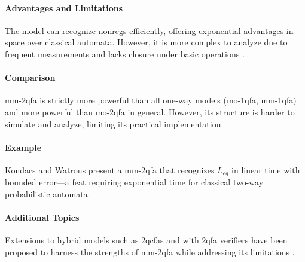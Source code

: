 \paragraph{Advantages and Limitations} The model can recognize non\glspl{reg} efficiently, offering exponential advantages in space over classical automata. However, it is more complex to analyze due to frequent measurements and lacks closure under basic operations \cite{kondacs1997power, qiu2008state}.

\paragraph{Comparison} \gls{mm-2qfa} is strictly more powerful than all one-way models (\gls{mo-1qfa}, \gls{mm-1qfa}) and more powerful than \gls{mo-2qfa} in general. However, its structure is harder to simulate and analyze, limiting its practical implementation.

\paragraph{Example} Kondacs and Watrous \cite{kondacs1997power} present a \gls{mm-2qfa} that recognizes $L_{eq}$ in linear time with bounded error—a feat requiring exponential time for classical two-way probabilistic automata.

\paragraph{Additional Topics} Extensions to hybrid models such as \glspl{2qcfa} and  with \gls{2qfa} verifiers have been proposed to harness the strengths of \gls{mm-2qfa} while addressing its limitations \cite{pani2011empowering, qiu2008state}.


